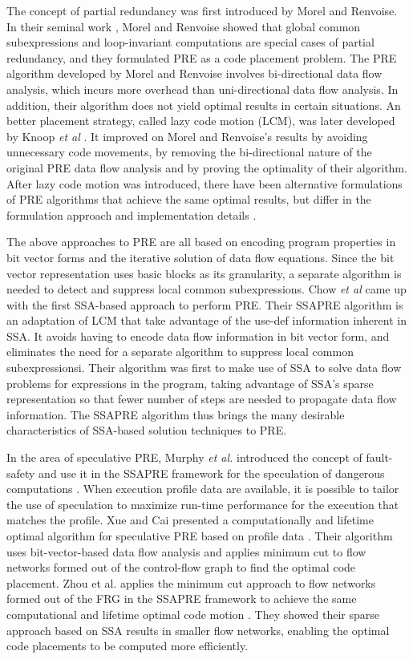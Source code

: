 The concept of partial redundancy was first introduced by Morel and 
Renvoise.  In their seminal work \cite{MR79}, Morel and Renvoise showed that
global common subexpressions and loop-invariant computations are special
cases of partial redundancy, and they formulated PRE as a code placement
problem.  The PRE algorithm developed by Morel and Renvoise
involves bi-directional data flow analysis, which incurs more overhead
than uni-directional data flow analysis.  In addition, their algorithm
does not yield optimal results in certain situations.
An better placement strategy, called lazy code motion (LCM), was later 
developed by Knoop {\it et al} \cite{Knoop92}\cite{Knoop94}.  It improved on
Morel and Renvoise's results by avoiding unnecessary code movements, by
removing the bi-directional nature of the original PRE data flow analysis and
by proving the optimality of their algorithm.
After lazy code motion was introduced, there have been alternative 
formulations of PRE algorithms that achieve the same optimal results, 
but differ in the formulation approach and implementation 
details \cite{DS93}\cite{Dhamdhere02}\cite{Paleri03}\cite{XueKnoop06}.

The above approaches to PRE are all based on encoding program properties 
in bit vector forms and the iterative solution of data flow equations.
Since the bit vector representation uses basic blocks as its granularity,
a separate algorithm is needed to detect and suppress local common
subexpressions.
Chow {\it et al} \cite{Chow97}\cite{Kennedy99} came up with the first
SSA-based approach to perform PRE.  Their SSAPRE algorithm is an adaptation of 
LCM that take advantage of the use-def information inherent in SSA.  It avoids
having to encode data flow information in bit vector form, and eliminates the
need for a separate algorithm to suppress local common subexpressionsi.
Their algorithm was first to make use of SSA to solve data flow problems
for expressions in the program, taking advantage of SSA's sparse representation
so that fewer number of steps are needed to propagate data flow information.  
The SSAPRE algorithm thus brings the many
desirable characteristics of SSA-based solution techniques to PRE.

In the area of speculative PRE,
Murphy {\it et al.} introduced the concept of fault-safety and use it in
the SSAPRE framework for the speculation of dangerous 
computations \cite{Murphy08}.   
When execution profile data are available, it is possible to tailor the use
of speculation to maximize run-time performance for the execution 
that matches the profile.  Xue and Cai presented a computationally 
and lifetime optimal algorithm
for speculative PRE based on profile data \cite{Xue06}.  Their algorithm
uses bit-vector-based data flow analysis and applies minimum cut to flow
networks formed out of the control-flow graph to find the optimal code
placement.  Zhou {et al.} applies the 
minimum cut approach to flow networks formed out of the FRG in the SSAPRE 
framework to achieve the same computational and lifetime optimal code 
motion \cite{zhou11}.  They showed their sparse approach based on SSA results
in smaller flow networks, enabling the optimal code placements to be 
computed more efficiently.

